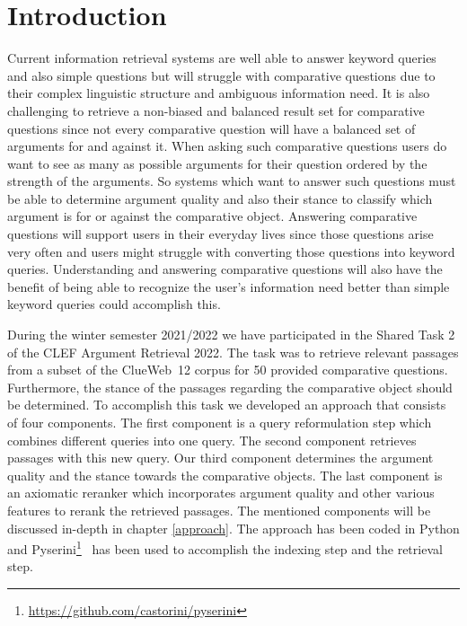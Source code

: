 \section{Introduction}\label{intro}

Current information retrieval systems are well able to answer keyword queries and also simple questions but will struggle with comparative questions due to their complex linguistic structure and ambiguous information need.
It is also challenging to retrieve a non-biased and balanced result set for comparative questions since not every comparative question will have a balanced set of arguments for and against it.
When asking such comparative questions users do want to see as many as possible arguments for their question ordered by the strength of the arguments.
So systems which want to answer such questions must be able to determine argument quality and also their stance to classify which argument is for or against the comparative object.
Answering comparative questions will support users in their everyday lives since those questions arise very often and users might struggle with converting those questions into keyword queries.
Understanding and answering comparative questions will also have the benefit of being able to recognize the user's information need better than simple keyword queries could accomplish this. 

During the winter semester 2021/2022 we have participated in the Shared Task 2 of the CLEF Argument Retrieval 2022.
The task was to retrieve relevant passages from a subset of the ClueWeb~12 corpus for 50 provided comparative questions. Furthermore, the stance of the passages regarding the comparative object should be determined.
To accomplish this task we developed an approach that consists of four components.
The first component is a query reformulation step which combines different queries into one query.
The second component retrieves passages with this new query.
Our third component determines the argument quality and the stance towards the comparative objects.
The last component is an axiomatic reranker which incorporates argument quality and other various features to rerank the retrieved passages.
The mentioned components will be discussed in-depth in chapter \ref{approach}. The approach has been coded in Python and Pyserini\footnote{\url{https://github.com/castorini/pyserini}}~\cite{LinMLYPN2021} has been used to accomplish the indexing step and the retrieval step.

